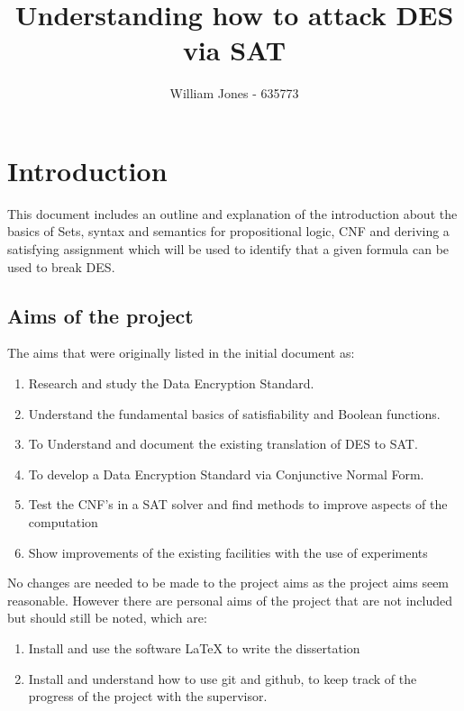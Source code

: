 \documentclass[11pt,a4paper]{article}
\author{William Jones - 635773}
\begin{document}
\title{Understanding how to attack DES via SAT}
\maketitle
\tableofcontents


\newpage

\section{Introduction}

This document includes an outline and explanation of the introduction about the basics of Sets, syntax and semantics for propositional logic, CNF and deriving a satisfying assignment which will be used to identify that a given formula can be used to break DES.

\subsection{Aims of the project}
The aims that were originally listed in the initial document as:
\begin{enumerate}
\item Research and study the Data Encryption Standard.
\item Understand the fundamental basics of satisfiability and Boolean functions.
\item To Understand and document the existing translation of DES to SAT.  
\item To develop a Data Encryption Standard via Conjunctive Normal Form.
\item Test the CNF's in a SAT solver and find methods to improve aspects of the computation
\item Show improvements of the existing facilities with the use of experiments
\end{enumerate}

No changes are needed to be made to the project aims as the project aims seem reasonable. However there are personal aims of the project that are not included but should still be noted, which are:

\begin{enumerate}
\item Install and use the software LaTeX to write the dissertation
\item Install and understand how to use git and github, to keep track of the progress of the project with the supervisor. 
\end{enumerate}  
\end{document}
